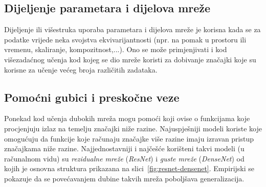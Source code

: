 \documentclass[utf8, diplomski, lmodern]{fer}
\begin{document}
\subsection{Dijeljenje parametara i dijelova mreže}

Dijeljenje ili višestruka uporaba parametara i dijelova mreže je korisna kada se za podatke vrijede neka svojstva ekvivarijantnosti (npr. na pomak u prostoru ili vremenu, skaliranje, kompozitnost,...). Ono se može primjenjivati i kod višezadaćnog učenja kod kojeg se dio mreže koristi za dobivanje značajki koje su korisne za učenje većeg broja različitih zadataka.

\subsection{Pomoćni gubici i preskočne veze}

Ponekad kod učenja dubokih mreža mogu pomoći  koji ovise o funkcijama koje procjenjuju izlaz na temelju značajki niže razine. Najuspješniji modeli koriste  koje omogućuju da funkcije koje računaju značajke više razine imaju izravan pristup značajkama niže razine. Najjednostavniji i najčešće korišteni takvi modeli (u računalnom vidu) su \textit{rezidualne mreže} (\textit{ResNet}) \citep{He:2015:DRLIR,He:2016:IMDRL} i \textit{guste mreže} (\textit{DenseNet}) \citep{Huang:2016:DCCN} od kojih je osnovna struktura prikazana na slici~\ref{fig:resnet-densenet}. Empirijski se pokazuje da se povećavanjem dubine takvih mreža poboljšava generalizacija.
\end{document}
